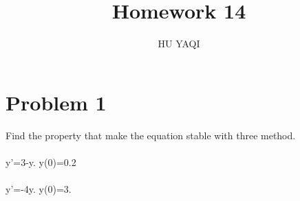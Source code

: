 \documentclass{article}
\title{ Homework 14 }
\author{HU YAQI}
\begin{document}
\maketitle
\setlength{\parindent}{0pt}
\section{ Problem 1 }
Find the property that make the equation stable with three method.\\
\\
y'=3-y. y(0)=0.2\\
\\
y'=-4y. y(0)=3.\\
\\
\end{document}
